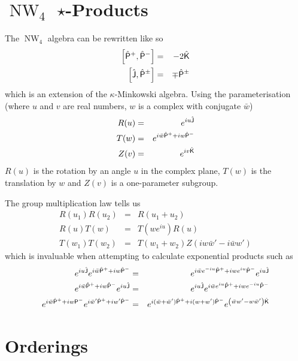 \documentclass[a4,12pt,titlepage]{seminar}
\def\P{{\sf P}} \def\K{{\sf K}} \def\J{{\sf J}} \def\T{{\sf FIXME}}
\DeclareMathOperator{\NW}{NW}                           %
\newcommand{\cb}[2]{\left[#1,#2\right]}                 %
\begin{document}
\clearpage
\section{$\NW_4$ $\star$-Products}

The $\NW_4$ algebra can be rewritten like so
\begin{eqnarray*}
  \cb{\hat{\P}^+}{\hat{\P}^-} &=& -2 \hat{\K} \\ \nonumber
  \cb{\hat{\J}}{\hat{\P}^\pm} &=& \mp\hat{\P}^\pm
\end{eqnarray*}
which is an extension of the $\kappa$-Minkowski algebra. Using the
parameterisation (where $u$ and $v$ are real numbers, $w$ is a complex with
conjugate $\bar w$)
\begin{eqnarray*}
  R(u) &=& e^{i u\hat{\J}} \\
  T(w) &=& e^{i\bar w\hat\P^++iw\hat\P^-} \\
  Z(v) &=& e^{iv\hat\K}
\end{eqnarray*}
$R(u)$ is the rotation by an angle $u$ in the complex plane, $T(w)$ is the
translation by $w$ and $Z(v)$ is a one-parameter subgroup.

The group multiplication law tells us
\begin{eqnarray*}
  R(u_1)R(u_2)&=&R(u_1+u_2) \\
  R(u)T(w)&=&T(we^{iu})R(u) \\
  T(w_1)T(w_2)&=&T(w_1+w_2)Z(iw\bar w'-i\bar w w')
\end{eqnarray*}
which is invaluable when attempting to calculate exponential products such as
\begin{eqnarray*}
  e^{iu\hat\J}e^{i\bar w\hat\P^++iw\hat\P^-}&=&e^{i\bar w e^{-i
      u}\hat\P^+ +iwe^{i u}\hat\P^-}e^{iu\hat\J} \\
  e^{i\bar w\hat\P^++iw\hat\P^-}e^{iu\hat\J}&=&e^{iu\hat\J}e^{i\bar w e^{i
      u}\hat\P^+ +iwe^{-i u}\hat\P^-} \\
  e^{i\bar w\hat\P^++iw\P^-}e^{i\bar w'\hat\P^++iw'\hat\P^-}&=&
  e^{i(\bar w+\bar w')\hat\P^++i(w+w')\hat\P^-}e^{\left(\bar ww'-w\bar
      w'\right)\hat\K}
\end{eqnarray*}

\clearpage
\section{Orderings}
\end{document}
